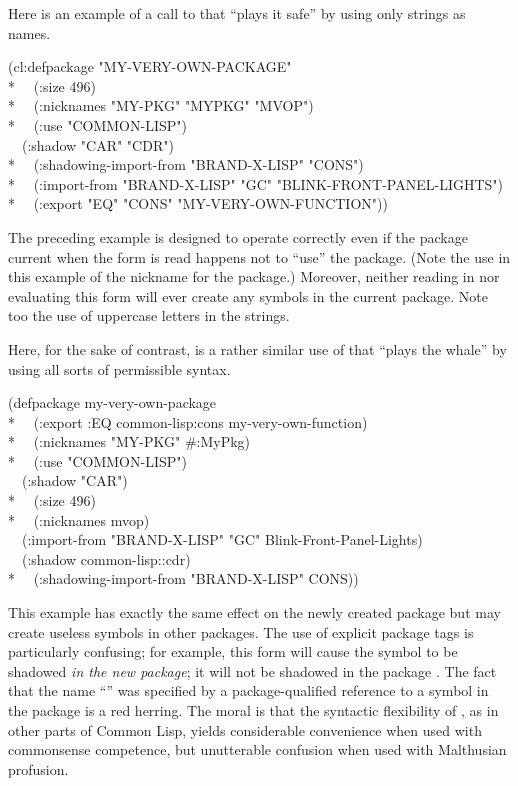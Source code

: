 \begin{new}
\begin{defmac}
Here is an example of a call to  that ``plays it safe''
by using only strings as names.
\begin{lisp}
(cl:defpackage "MY-VERY-OWN-PACKAGE" \\*
~~(:size 496) \\*
~~(:nicknames "MY-PKG" "MYPKG" "MVOP") \\*
~~(:use "COMMON-LISP") \\
~~(:shadow "CAR" "CDR") \\*
~~(:shadowing-import-from "BRAND-X-LISP" "CONS") \\*
~~(:import-from "BRAND-X-LISP" "GC" "BLINK-FRONT-PANEL-LIGHTS") \\*
~~(:export "EQ" "CONS" "MY-VERY-OWN-FUNCTION"))
\end{lisp}
The preceding  example is designed to operate correctly
even if the package current when the form is read happens not to
``use'' the  package.  (Note the use in this example
of the nickname  for the  package.)
Moreover, neither reading in nor evaluating
this  form will ever create any symbols in the
current package.  Note too the use of uppercase letters in the strings.

Here, for the sake of contrast, is a rather similar use of
 that ``plays the whale'' by using all sorts of
permissible syntax.
\begin{lisp}
(defpackage my-very-own-package \\*
~~(:export :EQ common-lisp:cons my-very-own-function) \\*
~~(:nicknames "MY-PKG" \#:MyPkg) \\*
~~(:use "COMMON-LISP") \\
~~(:shadow "CAR") \\*
~~(:size 496) \\*
~~(:nicknames mvop) \\
~~(:import-from "BRAND-X-LISP" "GC" Blink-Front-Panel-Lights) \\
~~(:shadow common-lisp::cdr) \\*
~~(:shadowing-import-from "BRAND-X-LISP" CONS))
\end{lisp}
This example has exactly the same effect on the newly created package
but may create useless symbols in other packages.
The use of explicit package tags is particularly confusing;
for example, this  form will cause the symbol
 to be shadowed \emph{in the new package}; it will not be
shadowed in the package .  The fact that the name ``''
was specified by a package-qualified reference to a symbol in the
 package is a red herring.
The moral is that the syntactic flexibility of ,
as in other parts of Common Lisp,
yields considerable convenience when used with commonsense competence,
but unutterable confusion when used with Malthusian profusion.


\end{defmac}
\end{new}
